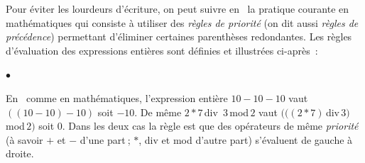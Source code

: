 {\begin{minipage}{\myparboxwidth}
\indent Pour éviter les lourdeurs d'écriture, on peut suivre en \pascal\ la pratique courante en
mathématiques qui consiste à utiliser des {\em règles de priorité} (on dit aussi {\em règles
de précédence}) permettant d'éliminer
certaines parenthèses redondantes.  Les règles d'évaluation des expressions entières sont
définies et illustrées ci-après~:
\begin{list}{$\scriptscriptstyle\bullet$}{
}
\item En \pascal\ comme en mathématiques, l'expression
entière $10 - 10 - 10$ vaut $((10 - 10) - 10)$ soit $-10$.  De même $ 2 \ast 7 \,${\mcl div}
$\, 3\,${\mcl mod}$\, 2$ vaut $(((2 \ast 7) \,${\mcl div}$\, 3)\,${\mcl mod}$\, 2)$ soit $0$. 
Dans les deux cas la règle est que des opérateurs de même {\em priorité} (à savoir $+$ et 
$-$ d'une part$\:$; $\ast$, {\mcl div} et {\mcl mod} d'autre part) s'évaluent de gauche à droite. 
\end{list}
\vspace{\abovedisplayskip}
\end{minipage}
}
